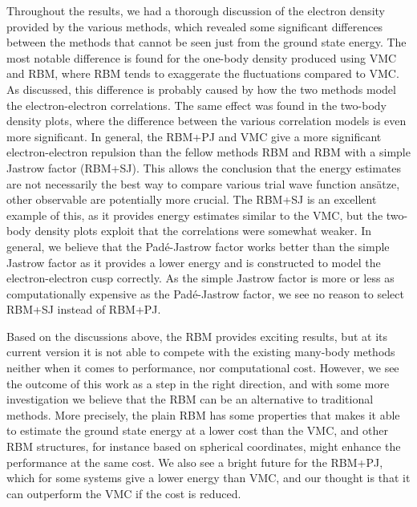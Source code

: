 Throughout the results, we had a thorough discussion of the electron density provided by the various methods, which revealed some significant differences between the methods that cannot be seen just from the ground state energy. The most notable difference is found for the one-body density produced using VMC and RBM, where RBM tends to exaggerate the fluctuations compared to VMC. As discussed, this difference is probably caused by how the two methods model the electron-electron correlations. The same effect was found in the two-body density plots, where the difference between the various correlation models is even more significant. In general, the RBM+PJ and VMC give a more significant electron-electron repulsion than the fellow methods RBM and RBM with a simple Jastrow factor (RBM+SJ). This allows the conclusion that the energy estimates are not necessarily the best way to compare various trial wave function ansätze, other observable are potentially more crucial. The RBM+SJ is an excellent example of this, as it provides energy estimates similar to the VMC, but the two-body density plots exploit that the correlations were somewhat weaker. In general, we believe that the Padé-Jastrow factor works better than the simple Jastrow factor as it provides a lower energy and is constructed to model the electron-electron cusp correctly. As the simple Jastrow factor is more or less as computationally expensive as the Padé-Jastrow factor, we see no reason to select RBM+SJ instead of RBM+PJ.

Based on the discussions above, the RBM provides exciting results, but at its current version it is not able to compete with the existing many-body methods neither when it comes to performance, nor computational cost. However, we see the outcome of this work as a step in the right direction, and with some more investigation we believe that the RBM can be an alternative to traditional methods. More precisely, the plain RBM has some properties that makes it able to estimate the ground state energy at a lower cost than the VMC, and other RBM structures, for instance based on spherical coordinates, might enhance the performance at the same cost. We also see a bright future for the RBM+PJ, which for some systems give a lower energy than VMC, and our thought is that it can outperform the VMC if the cost is reduced.

